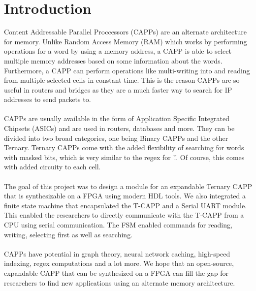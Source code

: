 \section{Introduction}
Content Addressable Parallel Proccessors (CAPPs) are an alternate architecture for memory. Unlike Random Access Memory (RAM) which works by 
performing operations for a word by using a memory address, a CAPP is able to select multiple memory addresses based on some information about the words. 
Furthermore, a CAPP can perform operations like multi-writing into and reading from multiple selected cells in constant time.
This is the reason CAPPs are so useful in routers and bridges as they are a much faster way to search for IP addresses to send packets to.
\\\\  
CAPPs are usually available in the form of Application Specific Integrated Chipsets (ASICs) and are used in routers, databases and more.
They can be divided into two broad categories, one being Binary CAPPs and the other Ternary. 
Ternary CAPPs come with the added flexibility of searching for words with masked bits, which is very similar to the regex for '.'. 
Of course, this comes with added circuity to each cell. 
\\\\ 
The goal of this project was to design a module for an expandable Ternary CAPP that is synthesizable on a FPGA using modern HDL tools. 
We also integrated a finite state machine that encapsulated the T-CAPP and a Serial UART module. 
This enabled the researchers to directly communicate with the T-CAPP from a CPU using serial communication.
The FSM enabled commands for reading, writing, selecting first as well as searching. 
\\\\
CAPPs have potential in graph theory, neural network caching, high-speed indexing, regex computations and a lot more. 
We hope that an open-source, expandable CAPP that can be synthesized on a FPGA can fill the gap for researchers to find new applications using an alternate memory architecture. 